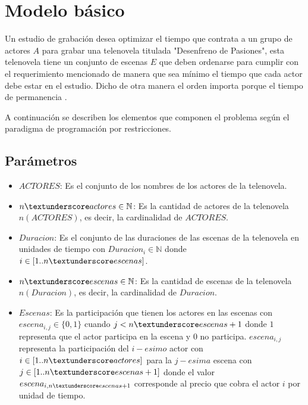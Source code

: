 \documentclass{article}
\begin{document}

\section{Modelo básico}
Un estudio de grabación desea optimizar el tiempo que contrata a un grupo de actores $A$ para grabar una telenovela titulada "Desenfreno de Pasiones", esta telenovela tiene un conjunto de escenas $E$ que deben ordenarse para cumplir con el requerimiento mencionado de manera que sea mínimo el tiempo que cada actor debe estar en el estudio. Dicho de otra manera el orden importa porque el tiempo de permanencia . \newline

A continuación se describen los elementos que componen el problema según el paradigma de programación por restricciones.

\subsection{Parámetros}
\begin{itemize}
    \item $ACTORES$: Es el conjunto de los nombres de los actores de la telenovela.
    \item $n\textunderscore actores \in \mathbb{N}$: Es la cantidad de actores de la telenovela $n(ACTORES)$, es decir, la cardinalidad de $ACTORES$.
    \item $Duracion$: Es el conjunto de las duraciones de las escenas de la telenovela en unidades de tiempo con $Duracion_i \in \mathbb{N}$ donde $i \in [1..n\textunderscore escenas]$.
    \item $n\textunderscore escenas \in \mathbb{N}$: Es la cantidad de escenas de la telenovela $n(Duracion)$, es decir, la cardinalidad de $Duracion$.
    \item $Escenas$: Es la participación que tienen los actores en las escenas con $escena_{i,j} \in \{0,1\}$ cuando $j < n\textunderscore escenas + 1 $ donde  $1$ representa que el actor participa en la escena y $0$ no participa. $escena_{i,j}$ representa la participación del $i-esimo$ actor con $i \in [1..n\textunderscore actores]$ para la $j-esima$ escena con $j \in [1..n\textunderscore escenas + 1]$ donde el valor $escena_{i,n\textunderscore escenas + 1}$ corresponde al precio que cobra el actor $i$ por unidad de tiempo.
\end{itemize}
\end{document}
